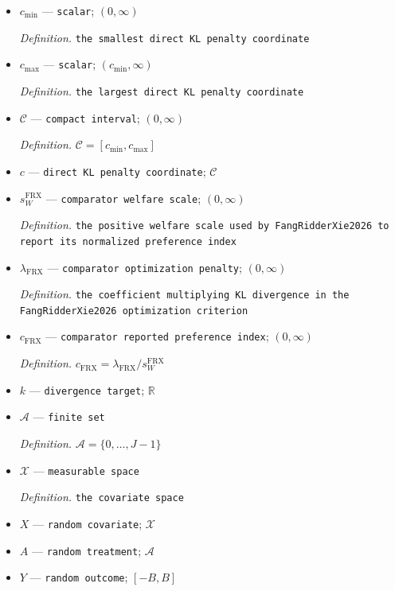 \documentclass{article}
\begin{document}
\begin{itemize}
  \par\smallskip\noindent\emph{Definition.} \texttt{the uniform optimizer-\allowbreak{}to-\allowbreak{}boundary distance}
  \item \(c_{\min}\) --- \texttt{scalar}; \((0,\infty)\)
  \par\smallskip\noindent\emph{Definition.} \texttt{the smallest direct KL penalty coordinate}
  \item \(c_{\max}\) --- \texttt{scalar}; \((c_{\min},\infty)\)
  \par\smallskip\noindent\emph{Definition.} \texttt{the largest direct KL penalty coordinate}
  \item \(\mathcal C\) --- \texttt{compact interval}; \((0,\infty)\)
  \par\smallskip\noindent\emph{Definition.} \(\mathcal C=[c_{\min},c_{\max}]\)
  \item \(c\) --- \texttt{direct KL penalty coordinate}; \(\mathcal C\)
  \item \(s_W^{\mathrm{FRX}}\) --- \texttt{comparator welfare scale}; \((0,\infty)\)
  \par\smallskip\noindent\emph{Definition.} \texttt{the positive welfare scale used by FangRidderXie2026 to report its normalized preference index}
  \item \(\lambda_{\mathrm{FRX}}\) --- \texttt{comparator optimization penalty}; \((0,\infty)\)
  \par\smallskip\noindent\emph{Definition.} \texttt{the coefficient multiplying KL divergence in the FangRidderXie2026 optimization criterion}
  \item \(c_{\mathrm{FRX}}\) --- \texttt{comparator reported preference index}; \((0,\infty)\)
  \par\smallskip\noindent\emph{Definition.} \(c_{\mathrm{FRX}}=\lambda_{\mathrm{FRX}}/s_W^{\mathrm{FRX}}\)
  \item \(k\) --- \texttt{divergence target}; \(\mathbb R\)
  \item \(\mathcal A\) --- \texttt{finite set}
  \par\smallskip\noindent\emph{Definition.} \(\mathcal A=\{0,\ldots,J-1\}\)
  \item \(\mathcal X\) --- \texttt{measurable space}
  \par\smallskip\noindent\emph{Definition.} \texttt{the covariate space}
  \item \(X\) --- \texttt{random covariate}; \(\mathcal X\)
  \item \(A\) --- \texttt{random treatment}; \(\mathcal A\)
  \item \(Y\) --- \texttt{random outcome}; \([-B,B]\)

\end{itemize}
\end{document}
